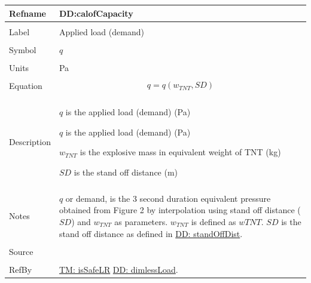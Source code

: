 \documentclass[12pt]{article}
\begin{document}
\noindent \begin{minipage}{\textwidth}
\begin{tabular}{p{} p{}}
\toprule \textbf{Refname} & \textbf{DD:calofCapacity}
\label{DD:calofCapacity}
\\ \midrule \\
Label & Applied load (demand)
\\ \midrule \\
Symbol & $q$
\\ \midrule \\
Units & Pa
\\ \midrule \\
Equation & \begin{dmath}
           q=q\left({w_{TNT}},SD\right)
           \end{dmath}
\\ \midrule \\
Description & \begin{symbDescription}
              \item{$q$ is the applied load (demand) (Pa)}
              \item{$q$ is the applied load (demand) (Pa)}
              \item{${w_{TNT}}$ is the explosive mass in equivalent weight of TNT (kg)}
              \item{$SD$ is the stand off distance (m)}
              \end{symbDescription}
\\ \midrule \\
Notes & $q$ or demand, is the 3 second duration equivalent pressure obtained from Figure 2 by interpolation using stand off distance ($SD$) and ${w_{TNT}}$ as parameters. ${w_{TNT}}$ is defined as $w TNT$. $SD$ is the stand off distance as defined in \hyperref[DD:standOffDist]{DD: standOffDist}.
\\ \midrule \\
Source & \cite{astm2009}
\\ \midrule \\
RefBy & \hyperref[TM:isSafeLR]{TM: isSafeLR} \hyperref[DD:dimlessLoad]{DD: dimlessLoad}.
\\ \bottomrule \end{tabular}
\end{minipage}\\
\end{document}
